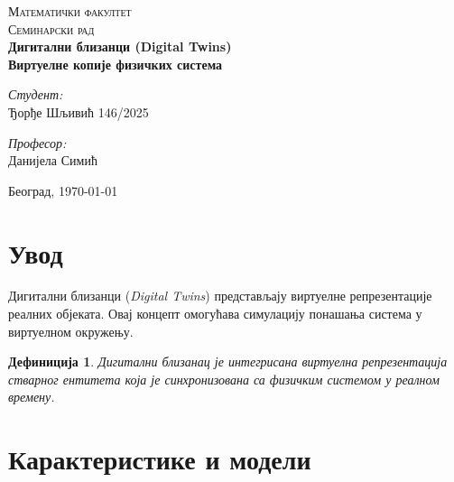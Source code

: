 \documentclass[12pt]{article}
\newtheorem{definicija}{Дефиниција}
\begin{document}
\begin{titlepage}
    \center 
    \textsc{\LARGE Математички факултет}\\[2cm] 
    \textsc{\Large Семинарски рад}\\[0.5cm]
   
    \vspace{1cm}
    {\LARGE\bfseries Дигитални близанци (Digital Twins) \\[0.4cm] \large Виртуелне копије физичких система} \\[1cm]
    
    \vspace{4cm}
    \begin{minipage}{0.4\textwidth}
        \begin{flushleft} \large
            \textit{Студент:}\\
            Ђорђе Шљивић 146/2025
        \end{flushleft}
    \end{minipage}
    \begin{minipage}{0.4\textwidth}
        \begin{flushright} \large
            \textit{Професор:}\\
            Данијела Симић
 \begin{figure}
            \centering
          
            
            \label{fig:placeholder}
        \end{figure}
                \end{flushright}
    \end{minipage}
    
    \vfill
    {\large Београд, \today} 
\end{titlepage}

\tableofcontents
\newpage


\section{Увод}
Дигитални близанци (\textit{Digital Twins}) представљају виртуелне репрезентације реалних објеката. Овај концепт омогућава симулацију понашања система у виртуелном окружењу.

\begin{definicija}
Дигитални близанац је интегрисана виртуелна репрезентација стварног ентитета која је синхронизована са физичким системом у реалном времену.
\end{definicija}


\section{Карактеристике и модели}
\end{document}
